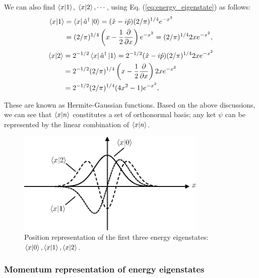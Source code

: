 We can also find $\braket{x|1}$, $\braket{x|2},\cdots$, using Eq. (\ref{eq:energy_eigenstate}) as follows:
\begin{equation}
\begin{aligned}
  \braket{x|1} &= \bra x \hat a^\dagger \ket 0 = (\hat x - i\hat p)(2/\pi)^{1/4}e^{-x^2}\\
  &= (2 / \pi)^{1/4}\left(x - \frac{1}{2}\frac{\partial}{\partial x}\right)e^{-x^2}  = (2/\pi)^{1/4}2xe^{-x^2},
\end{aligned}
\end{equation}
\begin{equation}
\begin{aligned}
  \braket{x|2} &= 2^{-1/2}\bra x \hat a^\dagger \ket 1 = 2^{-1/2}(\hat x - i\hat p)(2/\pi)^{1/4}2xe^{-x^2}\\
  &= 2^{-1/2}(2 / \pi)^{1/4}\left(x - \frac{1}{2}\frac{\partial}{\partial x}\right)2xe^{-x^2}\\  
  &= 2^{-1/2}(2/\pi)^{1/4}(4x^2-1)e^{-x^2},
\end{aligned}
\end{equation}

These are known as Hermite-Gaussian functions. Based on the above discussions, we can see that $\braket {x|n}$ constitutes a set of orthonormal basis; any ket $\psi$ can be represented by the linear combination of $\braket {x|n}$.

\begin{figure}
  \centering
  \includegraphics[width=9cm]{fig/3-2_Hermite_Gaussian.eps} 
  \caption{Position representation of the first three energy eigenstates: $\braket{x|0}, \braket {x|1}, \braket {x|2}$.}
  \label{fig:classical_phase_space}
\end{figure}


\subsubsection{Momentum representation of energy eigenstates}


